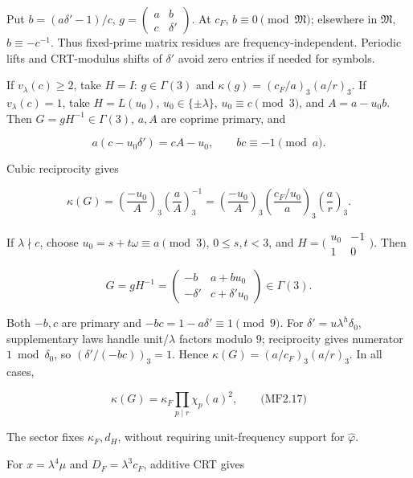 Put \(b=(a\delta'-1)/c\), \(g=\left(\begin{smallmatrix}a&b\\c&\delta'\end{smallmatrix}\right)\). At \(c_F\), \(b\equiv0\pmod{\mathfrak M}\); elsewhere in \(\mathfrak M\), \(b\equiv-c^{-1}\). Thus fixed-prime matrix residues are frequency-independent. Periodic lifts and CRT-modulus shifts of \(\delta'\) avoid zero entries if needed for symbols.

If \(v_\lambda(c)\ge2\), take \(H=I\): \(g\in\Gamma(3)\) and \(\kappa(g)=(c_F/a)_3(a/r)_3\). If \(v_\lambda(c)=1\), take \(H=L(u_0)\), \(u_0\in\{\pm\lambda\}\), \(u_0\equiv c\pmod3\), and \(A=a-u_0b\). Then \(G=gH^{-1}\in\Gamma(3)\), \(a,A\) are coprime primary, and

\[
a(c-u_0\delta')=cA-u_0,\qquad bc\equiv-1\pmod a.
\]

Cubic reciprocity gives

\[
\kappa(G)=
\left(\frac{-u_0}{A}\right)_3\left(\frac aA\right)_3^{-1}
=\left(\frac{-u_0}{A}\right)_3
 \left(\frac{c_F/u_0}{a}\right)_3\left(\frac ar\right)_3.
\]

If \(\lambda\nmid c\), choose \(u_0=s+t\omega\equiv a\pmod3\), \(0\le s,t<3\), and \(H=\bigl(\begin{smallmatrix}u_0&-1\\1&0\end{smallmatrix}\bigr)\). Then

\[
G=gH^{-1}=
\begin{pmatrix}-b&a+bu_0\\-\delta'&c+\delta'u_0\end{pmatrix}\in\Gamma(3).
\]

Both \(-b,c\) are primary and \(-bc=1-a\delta'\equiv1\pmod9\). For \(\delta'=u\lambda^h\delta_0\), supplementary laws handle unit/\(\lambda\) factors modulo \(9\); reciprocity gives numerator \(1\bmod\delta_0\), so \((\delta'/(-bc))_3=1\). Hence \(\kappa(G)=(a/c_F)_3(a/r)_3\). In all cases,

\hypertarget{mf:eq:B2.17}{}

\label{mf:eq:B2.17}

\[
\kappa(G)=\kappa_F\prod_{p\mid r}\chi_p(a)^2,
\qquad\text{(MF2.17)}
\]

The sector fixes \(\kappa_F,d_H\), without requiring unit-frequency support for \(\widehat\varphi\).

For \(x=\lambda^4\mu\) and \(D_F=\lambda^3c_F\), additive CRT gives

\hypertarget{mf:eq:B2.18}{}

